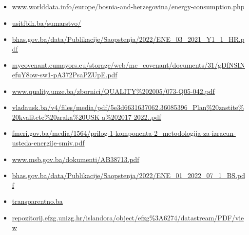 \documentclass[12pt, a4paper]{paper}
\begin{document}
\begin{sloppypar}
\begin{itemize}
    \item \url{www.worlddata.info/europe/bosnia-and-herzegovina/energy-consumption.php}
    \item \url{usitfbih.ba/sumarstvo/}
    \item \url{bhas.gov.ba/data/Publikacije/Saopstenja/2022/ENE_03_2021_Y1_1_HR.pdf}
    \item \url{mycovenant.eumayors.eu/storage/web/mc_covenant/documents/31/gDfNSINefuY8ow-sw1-pA372PsaPZUpE.pdf}
    \item \url{www.quality.unze.ba/zbornici/QUALITY%202005/073-Q05-042.pdf}
    \item \url{vladausk.ba/v4/files/media/pdf/5e3d6631637062.36085396_Plan%20zastite%20kvalitete%20zraka%20USK-a%202017-2022..pdf}
    \item \url{fmeri.gov.ba/media/1564/prilog-1-komponenta-2_metodologija-za-izracun-usteda-energije-smiv.pdf}
    \item \url{www.msb.gov.ba/dokumenti/AB38713.pdf}
    \item \url{bhas.gov.ba/data/Publikacije/Saopstenja/2022/ENE_01_2022_07_1_BS.pdf}
    \item 
    \url{transparentno.ba}
    \item 
    \url{repozitorij.efzg.unizg.hr/islandora/object/efzg%3A6274/datastream/PDF/view}
\end{itemize}
\end{sloppypar}
\end{document}
